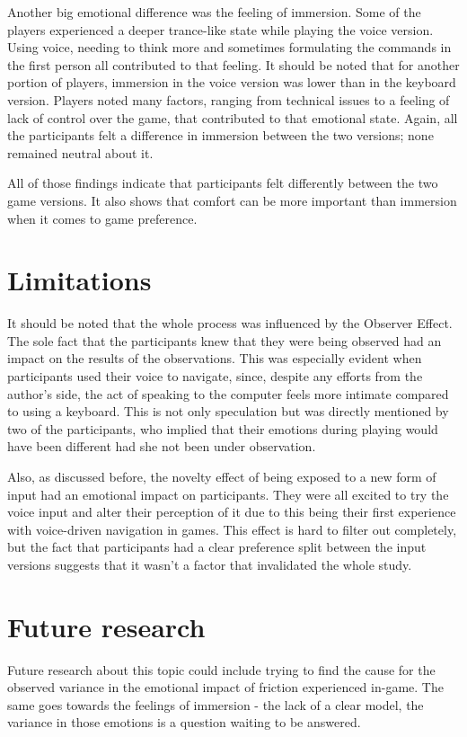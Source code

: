 Another big emotional difference was the feeling of immersion. 
Some of the players experienced a deeper trance-like state while playing the voice version. 
Using voice, needing to think more and sometimes formulating the commands in the first person all contributed to that feeling.
It should be noted that for another portion of players, immersion in the voice version was lower than in the keyboard version.
Players noted many factors, ranging from technical issues to a feeling of lack of control over the game, that contributed to that emotional state.
Again, all the participants felt a difference in immersion between the two versions; none remained neutral about it.


All of those findings indicate that participants felt differently between the two game versions. 
It also shows that comfort can be more important than immersion when it comes to game preference.



\section{Limitations}



It should be noted that the whole process was influenced by the Observer Effect. The sole fact that the participants knew that they were being observed had an impact on the results of the observations. This was especially evident when participants used their voice to navigate, since, despite any efforts from the author's side, the act of speaking to the computer feels more intimate compared to using a keyboard. This is not only  speculation but was directly mentioned by two of the participants, who implied that their emotions during playing would have been different had she not been under observation. 

Also, as discussed before, the novelty effect of being exposed to a new form of input had an emotional impact on participants.
They were all excited to try the voice input and alter their perception of it due to this being their first experience with voice-driven navigation in games.
This effect is hard to filter out completely, but the fact that participants had a clear preference split between the input versions suggests that it wasn't a factor that invalidated the whole study.





\section{Future research}

Future research about this topic could include trying to find the cause for the observed variance in the emotional impact of friction experienced in-game. The same goes towards the feelings of immersion - the lack of a clear model, the variance in those emotions is a question waiting to be answered.